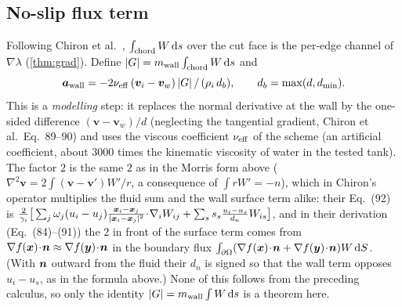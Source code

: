 \subsection{No-slip flux term}
Following Chiron et al.~\cite{chiron2019}, $\int_{\mathrm{chord}}W\,\mathrm{d} s$ over the cut face is the per-edge channel of $\nabla\lambda$ (\cref{thm:grad}). Define
$|G|=m_{\rm wall}\int_{\mathrm{chord}}W\,\mathrm{d} s$ and
\begin{equation}
 \bm a_{\rm wall}=-2\nu_{\rm eff}\,(\bm v_i-\bm v_w)\,|G|\,/\,(\rho_i\,d_b),\qquad d_b=\max(d,d_{\min}).
\end{equation}
This is a \emph{modelling} step: it replaces the normal derivative at the wall by the one-sided difference $(\bm v-\bm v_w)/d$ (neglecting the tangential gradient, Chiron et al.\ Eq.~89--90) and uses the viscous coefficient $\nu_{\rm eff}$
of the scheme (an artificial coefficient, about $3000$ times the kinematic viscosity of water in the tested tank). The factor $2$ is the same $2$ as in the Morris form above ($\nabla^2\bm v=2\int(\bm v-\bm v')W'/r$, a consequence of $\int rW'=-n$), which in Chiron's operator multiplies the fluid sum and the wall surface term alike: their Eq.~(92) is
$\frac2{\gamma_i}\big[\sum_j\omega_j(u_i-u_j)\frac{\bm x_i-\bm x_j}{|\bm x_i-\bm x_j|^2}\!\cdot\!\nabla_iW_{ij}+\sum_s s_s\frac{u_i-u_s}{d_n}W_{is}\big]$, and in their derivation (Eq.~(84)--(91)) the $2$ in front of the
surface term comes from $\nabla f(\bm x)\!\cdot\!\bm n\approx\nabla f(\bm y)\!\cdot\!\bm n$ in the boundary flux $\int_{\partial\Omega}(\nabla f(\bm x)\!\cdot\!\bm n+\nabla f(\bm y)\!\cdot\!\bm n)W\,\mathrm{d} S$. (With $\bm n$ outward from the fluid their
$d_n$ is signed so that the wall term opposes $u_i-u_s$, as in the formula above.) None of
this follows from the preceding calculus, so only the identity $|G|=m_{\rm wall}\int W\,\mathrm{d} s$ is a theorem here. 
